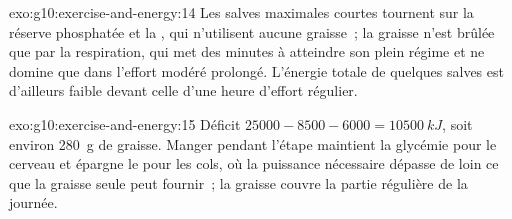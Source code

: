 \begin{solution}{exo:g10:exercise-and-energy:14}
Les salves maximales courtes tournent sur la réserve phosphatée et la
, qui n'utilisent aucune graisse~; la graisse n'est brûlée
que par la respiration, qui met des minutes à atteindre son plein
régime et ne domine que dans l'effort modéré prolongé. L'énergie totale
de quelques salves est d'ailleurs faible devant celle d'une heure
d'effort régulier.
\end{solution}

\begin{solution}{exo:g10:exercise-and-energy:15}
Déficit $25000 - 8500 - 6000 = \qty{10500}{kJ}$, soit environ
\qty{280}{g} de graisse. Manger pendant l'étape maintient la glycémie
pour le cerveau et épargne le  pour les cols, où la puissance
nécessaire dépasse de loin ce que la graisse seule peut fournir~; la
graisse couvre la partie régulière de la journée.
\end{solution}

